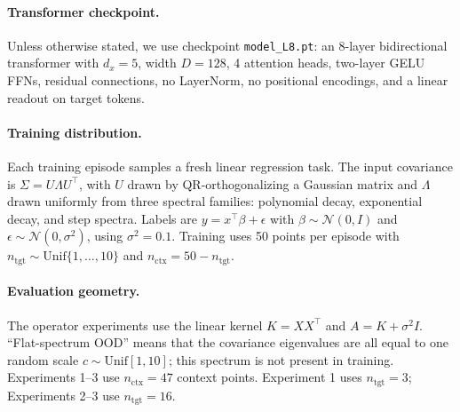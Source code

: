 \documentclass[11pt]{article}
\begin{document}
\paragraph{Transformer checkpoint.}
Unless otherwise stated, we use checkpoint \texttt{model\_L8.pt}: an 8-layer bidirectional
transformer with \(d_x=5\), width \(D=128\), 4 attention heads, two-layer GELU FFNs, residual
connections, no LayerNorm, no positional encodings, and a linear readout on target tokens.

\paragraph{Training distribution.}
Each training episode samples a fresh linear regression task. The input covariance is
\(\Sigma=U\Lambda U^\top\), with \(U\) drawn by QR-orthogonalizing a Gaussian matrix and
\(\Lambda\) drawn uniformly from three spectral families: polynomial decay, exponential decay, and
step spectra. Labels are \(y=x^\top\beta+\epsilon\) with \(\beta\sim\mathcal{N}(0,I)\) and
\(\epsilon\sim\mathcal{N}(0,\sigma^2)\), using \(\sigma^2=0.1\). Training uses 50 points per episode
with \(n_{\mathrm{tgt}}\sim\mathrm{Unif}\{1,\ldots,10\}\) and
\(n_{\mathrm{ctx}}=50-n_{\mathrm{tgt}}\).

\paragraph{Evaluation geometry.}
The operator experiments use the linear kernel \(K=XX^\top\) and \(A=K+\sigma^2I\).
``Flat-spectrum OOD'' means that the covariance eigenvalues are all equal to one random scale
\(c\sim\mathrm{Unif}[1,10]\); this spectrum is not present in training. Experiments 1--3 use
\(n_{\mathrm{ctx}}=47\) context points. Experiment 1 uses \(n_{\mathrm{tgt}}=3\); Experiments 2--3 use
\(n_{\mathrm{tgt}}=16\).
\end{document}
